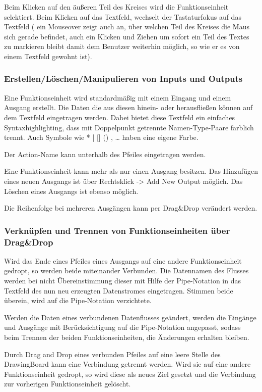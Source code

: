 	Beim Klicken auf den äußeren Teil des Kreises wird die Funktionseinheit
	selektiert. Beim Klicken auf das Textfeld, wechselt der Tastaturfokus auf
	das Textfeld ( ein Mouseover zeigt auch an, über welchen Teil des Kreises
	die Maus sich gerade befindet, auch ein Klicken und Ziehen um sofort ein Teil
	des Textes zu markieren bleibt damit dem Benutzer weiterhin möglich, so wie er es von
	einem Textfeld gewohnt ist).
	
	
\subsubsection{Erstellen/Löschen/Manipulieren von Inputs und Outputs}

	Eine Funktionseinheit wird standardmäßig mit einem Eingang und einem Ausgang
	erstellt. Die Daten die aus diesen hinein- oder herausfließen können auf
	dem Textfeld eingetragen werden. Dabei bietet diese Textfeld ein einfaches
	Syntaxhighlighting, dass mit Doppelpunkt getrennte Namen-Type-Paare
	farblich trennt. Auch Symbole wie * | [] () , \ldots{} haben eine eigene Farbe.
	
	Der Action-Name kann unterhalb des Pfeiles eingetragen werden.
	
	Eine Funktionseinheit kann mehr als nur einen Ausgang besitzen.
	Das Hinzufügen eines neuen Ausgangs ist über Rechtsklick -> Add New Output möglich.
	Das Löschen eines Ausgangs ist ebenso möglich.

	Die Reihenfolge bei mehreren Ausgängen kann per Drag\&Drop verändert werden.
	
\subsubsection{Verknüpfen und Trennen von Funktionseinheiten über Drag\&Drop }

	Wird das Ende eines Pfeiles eines Ausgangs auf eine andere Funktionseinheit gedropt, so werden beide
	miteinander Verbunden. Die Datennamen des Flusses werden bei nicht
	Übereinstimmung dieser mit Hilfe der Pipe-Notation in das Textfeld des nun neu
   erzeugten Datenstromes eingetragen. Stimmen beide überein, wird auf die Pipe-Notation
	verzichtete.
	
	Werden die Daten eines verbundenen Datenflusses geändert, werden die Eingänge
	und Ausgänge mit Berücksichtigung auf die Pipe-Notation angepasst, sodass
	beim Trennen der beiden Funktionseinheiten, die Änderungen erhalten bleiben.
	
	Durch Drag and Drop eines verbunden Pfeiles auf eine leere Stelle des
	DrawingBoard kann eine Verbindung getrennt werden. Wird sie auf eine
	andere Funktionseinheit gedropt, so wird diese als neues Ziel gesetzt und die 
	Verbindung zur vorherigen Funktionseinheit gelöscht. 
	
